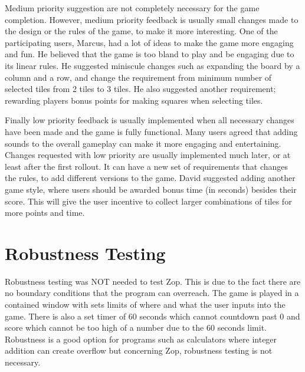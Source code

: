 \documentclass[12pt]{article}
\begin{document}
Medium priority suggestion are not completely necessary for the game completion. However, medium priority feedback is usually small changes made to the design or the rules of the game, to make it more interesting. One of the participating users, Marcus, had a lot of ideas to make the game more engaging and fun. He believed that the game is too bland to play and be engaging due to its linear rules. He suggested miniscule changes such as expanding the board by a column and a row, and change the requirement from minimum number of selected tiles from 2 tiles to 3 tiles. He also suggested another requirement; rewarding players bonus points for making squares when selecting tiles.

Finally low priority feedback is usually implemented when all necessary changes have been made and the game is fully functional. Many users agreed that adding sounds to the overall gameplay can make it more engaging and entertaining. Changes requested with low priority are usually implemented much later, or at least after the first rollout. It can have a new set of requirements that changes the rules, to add different versions to the game. David suggested adding another game style, where users should be awarded bonus time (in seconds) besides their score. This will give the user incentive to collect larger combinations of tiles for more points and time. 

\section{Robustness Testing}
Robustness testing was NOT needed to test Zop.  This is due to the fact there are no boundary conditions that the program can overreach.  The game is played in a contained window with sets limits of where and what the user inputs into the game.  There is also a set timer of 60 seconds which cannot countdown past 0 and score which cannot be too high of a number due to the 60 seconds limit.  Robustness is a good option for programs such as calculators where integer addition can create overflow but concerning Zop, robustness testing is not necessary.
\end{document}
